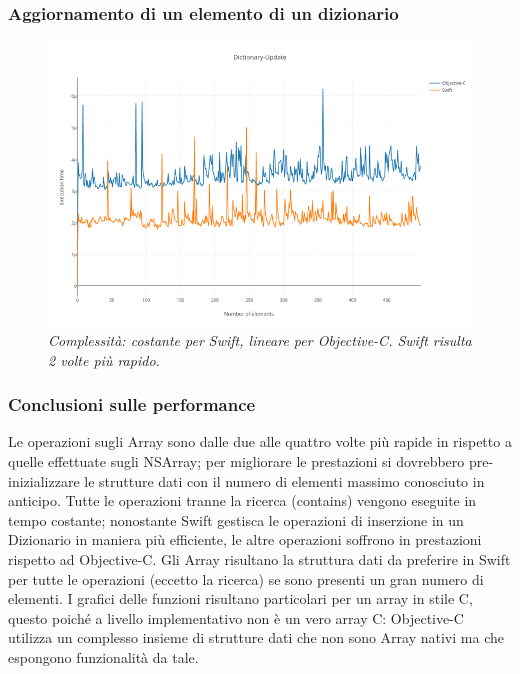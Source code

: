 \subsubsection{Aggiornamento di un elemento di un dizionario}
\begin{figure}[H]
      \centering
      \includegraphics[scale=0.50]{immagini/dictionary_update.png}
            \vspace{0.8cm}
            \caption{\textit{Complessità: costante per Swift, lineare per Objective-C. Swift risulta 2 volte più rapido.}}
\end{figure}
\subsubsection{Conclusioni sulle performance}
Le operazioni sugli Array sono dalle due alle quattro volte più rapide in rispetto a quelle effettuate sugli NSArray; per migliorare le prestazioni si dovrebbero pre-inizializzare le strutture dati con il numero di elementi massimo conosciuto in anticipo. Tutte le operazioni tranne la ricerca (contains) vengono eseguite in tempo costante; nonostante Swift gestisca le operazioni di inserzione in un Dizionario in maniera più efficiente, le altre operazioni soffrono in prestazioni rispetto ad Objective-C. Gli Array risultano la struttura dati da preferire in Swift per tutte le operazioni (eccetto la ricerca) se sono presenti un gran numero di elementi. I grafici delle funzioni risultano particolari per un array in stile C, questo poiché a livello implementativo non è un vero array C: Objective-C utilizza un complesso insieme di strutture dati che non sono Array nativi ma che espongono funzionalità da tale.
    
    
    
    


